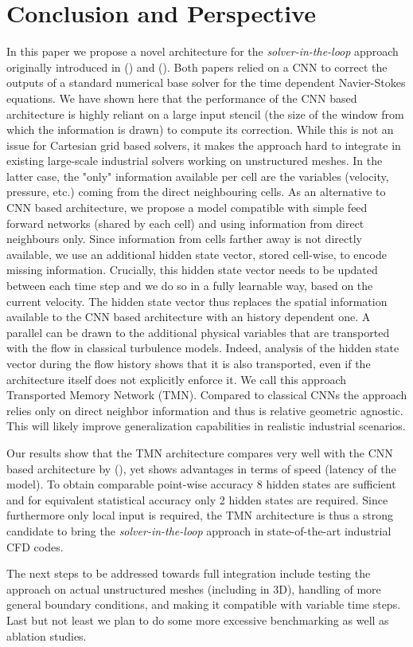 \section{Conclusion and Perspective}

In this paper we propose a novel architecture for the \textit{solver-in-the-loop} approach originally introduced in \citeauthor{um2020solver} (\citeyear{um2020solver}) and \citeauthor{kochkov2021machine} (\citeyear{kochkov2021machine}). Both papers relied on a CNN to correct the outputs of a standard numerical base solver for the time dependent Navier-Stokes equations. We have shown here that the performance of the CNN based architecture is highly reliant on a large input stencil (the size of the window from which the information is drawn) to compute its correction. While this is not an issue for Cartesian grid based solvers, it makes the approach hard to integrate in existing large-scale industrial solvers working on unstructured meshes. In the latter case,  the "only" information available per cell are the variables (velocity, pressure, etc.) coming from the direct neighbouring cells. As an alternative to CNN based architecture, we propose a model compatible with simple feed forward networks (shared by each cell) and using information from direct neighbours only. Since information from cells farther away is not directly available, we use an additional hidden state vector, stored cell-wise, to encode missing information. Crucially, this hidden state vector needs to be updated between each time step and we do so in a fully learnable way, based on the current velocity. The hidden state vector thus replaces the spatial information available to the CNN based architecture with an history dependent one. A parallel can be drawn to the additional physical variables that are transported with the flow in classical turbulence models. Indeed, analysis of the hidden state vector during the flow history shows that it is also transported, even if the architecture itself does not explicitly enforce it. We call this approach Transported Memory Network (TMN). Compared to classical CNNs the approach relies only on direct neighbor information and thus is relative geometric agnostic. This will likely improve generalization capabilities in realistic industrial scenarios. 

Our results show that the TMN architecture compares very well with the CNN based architecture by \citeauthor{kochkov2021machine} (\citeyear{kochkov2021machine}), yet shows advantages in terms of speed (latency of the model). To obtain comparable point-wise accuracy 8 hidden states are sufficient and for equivalent statistical accuracy only 2 hidden states are required. Since furthermore only local input is required, the TMN architecture is thus a strong candidate to bring the \textit{solver-in-the-loop} approach in state-of-the-art industrial CFD codes. 

The next steps to be addressed towards full integration include testing the approach on actual unstructured meshes (including in 3D), handling of more general boundary conditions, and making it compatible with variable time steps. Last but not least we plan to do some more excessive benchmarking as well as ablation studies.
